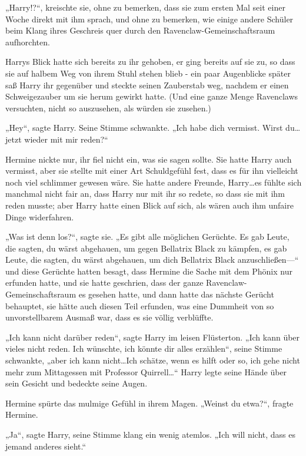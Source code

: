 {„Harry!?“, kreischte sie, ohne zu bemerken, dass sie zum ersten Mal seit einer Woche direkt mit ihm sprach, und ohne zu bemerken, wie einige andere Schüler beim Klang ihres Geschreis quer durch den Ravenclaw-Gemeinschaftsraum aufhorchten.

Harrys Blick hatte sich bereits zu ihr gehoben, er ging bereits auf sie zu, so dass sie auf halbem Weg von ihrem Stuhl stehen blieb - ein paar Augenblicke später saß Harry ihr gegenüber und steckte seinen Zauberstab weg, nachdem er einen Schweigezauber um sie herum gewirkt hatte. (Und eine ganze Menge Ravenclaws versuchten, nicht so auszusehen, als würden sie zusehen.)

„Hey“, sagte Harry. Seine Stimme schwankte. „Ich habe dich vermisst. Wirst du…jetzt wieder mit mir reden?“

Hermine nickte nur, ihr fiel nicht ein, was sie sagen sollte. Sie hatte Harry auch vermisst, aber sie stellte mit einer Art Schuldgefühl fest, dass es für ihn vielleicht noch viel schlimmer gewesen wäre. Sie hatte andere Freunde, Harry…es fühlte sich manchmal nicht fair an, dass Harry nur mit ihr so redete, so dass sie mit ihm reden musste; aber Harry hatte einen Blick auf sich, als wären auch ihm unfaire Dinge widerfahren.

„Was ist denn los?“, sagte sie. „Es gibt alle möglichen Gerüchte. Es gab Leute, die sagten, du wärst abgehauen, um gegen Bellatrix Black zu kämpfen, es gab Leute, die sagten, du wärst abgehauen, um dich Bellatrix Black anzuschließen—“ und diese Gerüchte hatten besagt, dass Hermine die Sache mit dem Phönix nur erfunden hatte, und sie hatte geschrien, dass der ganze Ravenclaw-Gemeinschaftsraum es gesehen hatte, und dann hatte das nächste Gerücht behauptet, sie hätte auch diesen Teil erfunden, was eine Dummheit von so unvorstellbarem Ausmaß war, dass es sie völlig verblüffte.

„Ich kann nicht darüber reden“, sagte Harry im leisen Flüsterton. „Ich kann über vieles nicht reden. Ich wünschte, ich könnte dir alles erzählen“, seine Stimme schwankte, „aber ich kann nicht…Ich schätze, wenn es hilft oder so, ich gehe nicht mehr zum Mittagessen mit Professor Quirrell…“ Harry legte seine Hände über sein Gesicht und bedeckte seine Augen.

Hermine spürte das mulmige Gefühl in ihrem Magen. „Weinst du etwa?“, fragte Hermine.

„Ja“, sagte Harry, seine Stimme klang ein wenig atemlos. „Ich will nicht, dass es jemand anderes sieht.“

}
